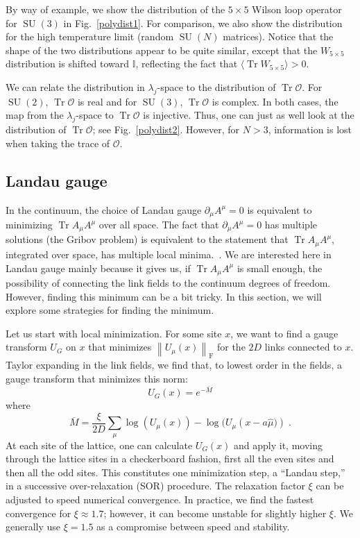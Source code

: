 \documentclass[preprint,aps,prd]{revtex4-2}
\newcommand{\be}{\begin{equation}}
\newcommand{\eq}{\end{equation}}
\newcommand{\orelax}{\xi}
\DeclareMathOperator{\SU}{SU}
\DeclareMathOperator{\Tr}{Tr}
\newcommand\fnorm[1]{\left\lVert #1 \right\rVert_\mathrm{F}}
\begin{document}
By way of example, we show the distribution of the
$5\times5$ Wilson loop operator for $\SU(3)$ in Fig.~\ref{polydist1}.
For comparison, we also show the distribution for
the high temperature limit (random $\SU(N)$ matrices).
Notice that the shape of the two distributions appear to
be quite similar, except that the $W_{5\times5}$ distribution
is shifted toward $\mathbb{I}$, reflecting the fact that
$\langle\Tr W_{5\times5}\rangle >0$.

We can relate the distribution in $\lambda_j$-space to the
distribution of $\Tr\mathcal{O}$.
For $\SU(2)$, $\Tr \mathcal{O}$ is real and for $\SU(3)$, $\Tr \mathcal{O}$
is complex.  In both cases, the map from the $\lambda_j$-space to
$\Tr \mathcal{O}$ is injective.  Thus, one can just as well look at the
distribution of $\Tr \mathcal{O}$; see Fig.~\ref{polydist2}.
However, for $N>3$, information is lost when taking the trace
of $\mathcal{O}$.

\subsection{Landau gauge}

In the continuum, the choice of Landau gauge $\partial_\mu A^\mu = 0$
is equivalent to minimizing $\Tr A_\mu A^\mu$ over all space.  The fact that
$\partial_\mu A^\mu = 0$ has multiple solutions (the Gribov problem) is
equivalent to the statement that $\Tr A_\mu A^\mu$, integrated over space,
has multiple local minima.~\cite{maas_more_2009}.
We are interested here in Landau gauge mainly
because it gives us, if $\Tr A_\mu A^\mu$ is small enough, the
possibility of connecting the
link fields to the continuum degrees of freedom.
However, finding this minimum can be a bit tricky.  In this
section, we will explore some strategies for finding the minimum.

Let us start with local minimization.
For some site $x$, we want to find a gauge transform $U_G$ on $x$
that minimizes $\fnorm{U_\mu(x)}$ for the $2D$
links connected to $x$.  Taylor expanding in the link fields,
we find that, to lowest order in the fields, a gauge transform
that minimizes this norm:
%
\be
          U_G(x) = e^{- \overline{M}}
\eq
where
\be
   \overline{M} = \frac{\orelax}{2 D} \sum_\mu \log\left(U_\mu(x)\right) -
   \log(U_\mu\left(x-a \hat{\mu})\right)  \; . \label{landau}
\eq
At each site of the lattice, one can calculate $U_G(x)$ and apply it,
moving through the lattice sites in a checkerboard fashion,
first all the even sites and then all the odd sites.
This constitutes one minimization step, a ``Landau step,'' in a
successive over-relaxation (SOR) procedure.
The relaxation factor $\orelax$ can be adjusted to speed numerical
convergence.
In practice, we find the fastest convergence for $\orelax \approx 1.7$;
however, it can become unstable for slightly higher $\orelax$.
We generally use $\orelax=1.5$ as a compromise between speed and stability.
\end{document}
